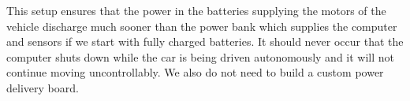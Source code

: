 This setup ensures that the power in the batteries supplying the motors of the vehicle discharge much sooner than the power bank which supplies the computer and sensors if we start with fully charged batteries. It should never occur that the computer shuts down while the car is being driven autonomously and it will not continue moving uncontrollably. We also do not need to build a custom power delivery board.
